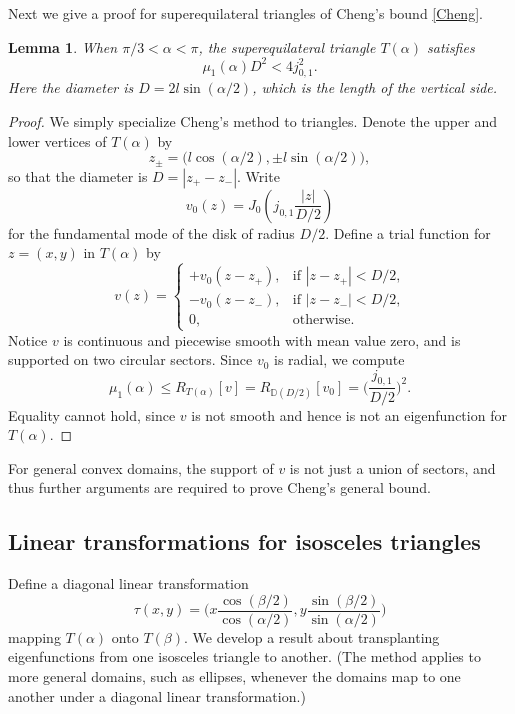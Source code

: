 \documentclass[11pt,reqno]{amsart}
\newtheorem{lemma}[theorem]{Lemma}
\numberwithin{equation}{section}
\begin{document}
Next we give a proof for superequilateral triangles of Cheng's bound \eqref{Cheng}.

\begin{lemma} \label{chengsupereq}
When $\pi/3 < \alpha < \pi$, the superequilateral triangle $T(\alpha)$ satisfies
\[
\mu_1(\alpha) D^2 < 4 j_{0,1}^2 .
\]
Here the diameter is $D=2 l \sin(\alpha/2)$, which is the length of the vertical side.
\end{lemma}

\begin{proof}
We simply specialize Cheng's method to triangles. Denote the upper and lower vertices of $T(\alpha)$ by
\[
z_\pm = \big( l \cos(\alpha/2) , \pm l \sin(\alpha/2) \big) ,
\]
so that the diameter is $D=|z_+ - z_-|$. Write
\[
v_0(z)=J_0 \! \left( j_{0,1}\frac{|z|}{D/2} \right)
\]
for the fundamental mode of the disk of radius $D/2$. Define a trial function for $z=(x,y)$ in $T(\alpha)$ by
\[
v(z) =
\begin{cases}
+v_0(z-z_+) , & \text{if $|z-z_+|<D/2$,} \\
-v_0(z-z_-) , & \text{if $|z-z_-|<D/2$,} \\
0 , & \text{otherwise.}
\end{cases}
\]
Notice $v$ is continuous and piecewise smooth with mean value zero, and is supported on two circular sectors. Since $v_0$ is radial, we compute
\[
\mu_1(\alpha) \leq R_{T(\alpha)}[v] = R_{{{\mathbb D}}(D/2)}[v_0] = \Big( \frac{j_{0,1}}{D/2} \Big)^{\! 2} .
\]
Equality cannot hold, since $v$ is not smooth and hence is not an eigenfunction for $T(\alpha)$.
\end{proof}

For general convex domains, the support of $v$ is not just a union of sectors, and thus further arguments are required to prove Cheng's general bound.

\subsection{Linear transformations for isosceles triangles} \label{isec2}

Define a diagonal linear transformation
\[
    \tau(x,y) = \Big( x\frac{\cos(\beta/2)}{\cos(\alpha/2)}, y\frac{\sin(\beta/2)}{\sin(\alpha/2)} \Big)
\]
mapping $T(\alpha)$ onto $T(\beta)$. We develop a result about transplanting eigenfunctions from one isosceles triangle to another. (The method applies to more general domains, such as ellipses, whenever the domains map to one another under a diagonal linear transformation.)
\end{document}
